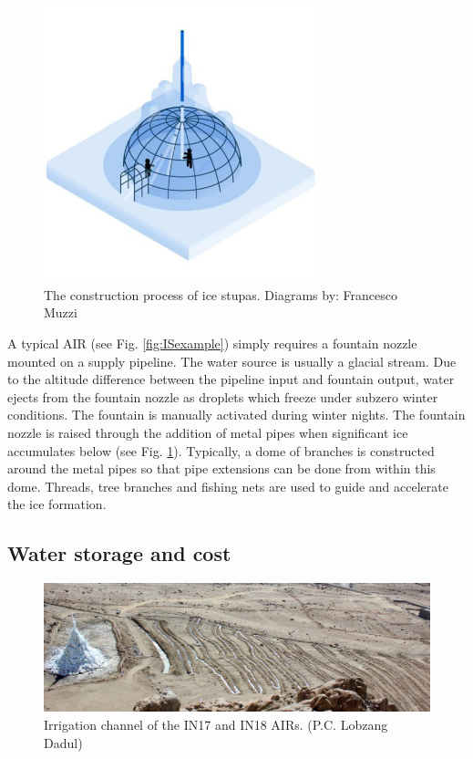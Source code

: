 \begin{figure}[htb]
\centering
\includegraphics[width=8cm]{figs/IS_science.jpg}

\caption{The construction process of ice stupas. Diagrams by: Francesco Muzzi }

\label{fig:ISconstruction}
\end{figure}

A typical AIR (see Fig. \ref{fig:ISexample}) simply requires a fountain nozzle mounted on a supply pipeline. The
water source is usually a glacial stream. Due to the altitude difference between the pipeline input and fountain
output, water ejects from the fountain nozzle as droplets which freeze under subzero winter conditions. The
fountain is manually activated during winter nights. The fountain nozzle is raised through the addition of metal
pipes when significant ice accumulates below (see Fig. \ref{fig:ISconstruction}).  Typically, a dome of branches
is constructed around the metal pipes so that pipe extensions can be done from within this dome. Threads, tree
branches and fishing nets are used to guide and accelerate the ice formation.

\subsection{Water storage and cost}

\begin{figure}[htb]
\centering
\includegraphics[width=12cm]{figs/IS_irrigation.jpeg}

\caption{Irrigation channel of the IN17 and IN18 AIRs. (P.C. Lobzang Dadul) }

\label{fig:ISirrigation}
\end{figure}

